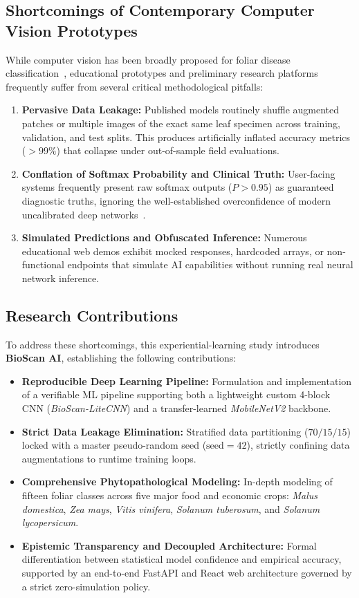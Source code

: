 \documentclass[11pt,a4paper]{article}
\begin{document}
\subsection{Shortcomings of Contemporary Computer Vision Prototypes}
While computer vision has been broadly proposed for foliar disease classification~\cite{mohanty2016using, kamilaris2018deep, ferentinos2018deep}, educational prototypes and preliminary research platforms frequently suffer from several critical methodological pitfalls:
\begin{enumerate}
    \item \textbf{Pervasive Data Leakage:} Published models routinely shuffle augmented patches or multiple images of the exact same leaf specimen across training, validation, and test splits. This produces artificially inflated accuracy metrics ($>99\%$) that collapse under out-of-sample field evaluations.
    \item \textbf{Conflation of Softmax Probability and Clinical Truth:} User-facing systems frequently present raw softmax outputs ($P > 0.95$) as guaranteed diagnostic truths, ignoring the well-established overconfidence of modern uncalibrated deep networks~\cite{guo2017calibration}.
    \item \textbf{Simulated Predictions and Obfuscated Inference:} Numerous educational web demos exhibit mocked responses, hardcoded arrays, or non-functional endpoints that simulate AI capabilities without running real neural network inference.
\end{enumerate}

\subsection{Research Contributions}
To address these shortcomings, this experiential-learning study introduces \textbf{BioScan AI}, establishing the following contributions:
\begin{itemize}
    \item \textbf{Reproducible Deep Learning Pipeline:} Formulation and implementation of a verifiable ML pipeline supporting both a lightweight custom 4-block CNN (\textit{BioScan-LiteCNN}) and a transfer-learned \textit{MobileNetV2} backbone.
    \item \textbf{Strict Data Leakage Elimination:} Stratified data partitioning ($70/15/15$) locked with a master pseudo-random seed ($\text{seed}=42$), strictly confining data augmentations to runtime training loops.
    \item \textbf{Comprehensive Phytopathological Modeling:} In-depth modeling of fifteen foliar classes across five major food and economic crops: \textit{Malus domestica}, \textit{Zea mays}, \textit{Vitis vinifera}, \textit{Solanum tuberosum}, and \textit{Solanum lycopersicum}.
    \item \textbf{Epistemic Transparency and Decoupled Architecture:} Formal differentiation between statistical model confidence and empirical accuracy, supported by an end-to-end FastAPI and React web architecture governed by a strict zero-simulation policy.
\end{itemize}
\end{document}
